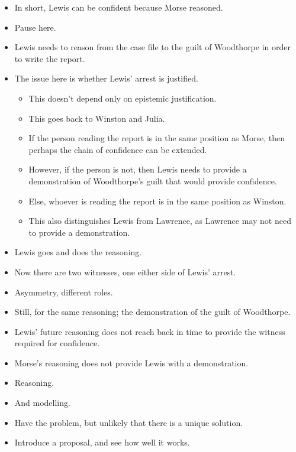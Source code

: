 \documentclass[10pt]{article}
\begin{document}
\begin{itemize}
\item In short, Lewis can be confident because Morse reasoned.
\end{itemize}

\begin{itemize}
\item Pause here.
\end{itemize}

\begin{itemize}
\item Lewis needs to reason from the case file to the guilt of Woodthorpe in order to write the report.
\item The issue here is whether Lewis' arrest is justified.
  \begin{itemize}
  \item This doesn't depend only on epistemic justification.
  \item This goes back to Winston and Julia.
  \item If the person reading the report is in the same position as Morse, then perhaps the chain of confidence can be extended.
  \item However, if the person is not, then Lewis needs to provide a demonstration of Woodthorpe's guilt that would provide confidence.
  \item Else, whoever is reading the report is in the same position as Winston.
  \item This also distinguishes Lewis from Lawrence, as Lawrence may not need to provide a demonstration.
  \end{itemize}
\end{itemize}

\begin{itemize}
\item Lewis goes and does the reasoning.
\item Now there are two witnesses, one either side of Lewis' arrest.
\item Asymmetry, different roles.
\item Still, for the same reasoning; the demonstration of the guilt of Woodthorpe.
\item Lewis' future reasoning does not reach back in time to provide the witness required for confidence.
\item Morse's reasoning does not provide Lewis with a demonstration.
\end{itemize}

\begin{itemize}
\item Reasoning.
\item And modelling.
\item Have the problem, but unlikely that there is a unique solution.
\item Introduce a proposal, and see how well it works.
\end{itemize}
\end{document}
